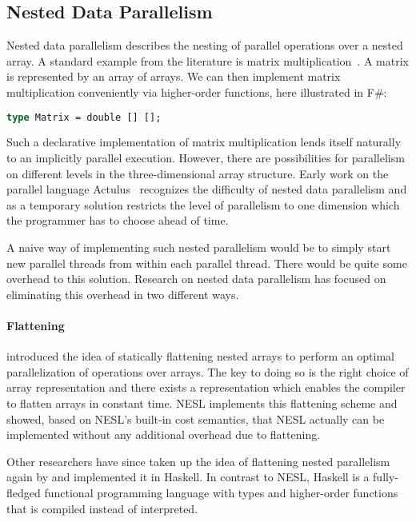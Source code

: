 \documentclass[a4paper]{article}
\begin{document}
\subsection{Nested Data Parallelism}
\label{sec:nest-data-parall}

Nested data parallelism describes the nesting of parallel operations
over a nested array. A standard example from the literature is matrix
multiplication~\cite{Keller:2010:RSP:1863543.1863582}. A matrix is
represented by an array of arrays. We can then implement matrix
multiplication conveniently via higher-order functions, here
illustrated in F\#:

\begin{lstlisting}[language=ML]
type Matrix = double [] [];
\end{lstlisting}

Such a declarative implementation of matrix multiplication lends
itself naturally to an implicitly parallel execution. However, there
are possibilities for parallelism on different levels in the
three-dimensional array structure. Early work on the parallel language
Actulus~\cite{Perrott:1979:LAV:357073.357075} recognizes the
difficulty of nested data parallelism and as a temporary solution
restricts the level of parallelism to one dimension which the
programmer has to choose ahead of time.

A naive way of implementing such nested parallelism would be to simply
start new parallel threads from within each parallel thread. There
would be quite some overhead to this solution. Research on nested data
parallelism has focused on eliminating this overhead in two different
ways.

\paragraph{Flattening}

\citet{Blelloch1993Implementation} introduced the idea of statically
flattening nested arrays to perform an optimal parallelization of
operations over arrays. The key to doing so is the right choice of
array representation and there exists a representation which enables
the compiler to flatten arrays in constant time. NESL implements this
flattening scheme and \citet{Blelloch:1996:PTS:232627.232650} showed,
based on NESL's built-in cost semantics, that NESL actually can be
implemented without any additional overhead due to flattening.

Other researchers have since taken up the idea of flattening nested
parallelism again by \citet{Lippmeier:2012:WEH:2364527.2364564} and
implemented it in Haskell. In contrast to NESL, Haskell is a
fully-fledged functional programming language with types and
higher-order functions that is compiled instead of interpreted.
\end{document}
